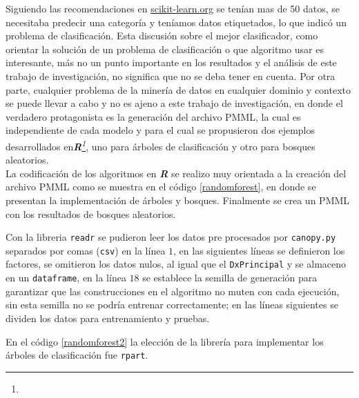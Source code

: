  Siguiendo las recomendaciones en \href{http://scikit-learn.org/stable/tutorial/machine_learning_map/index.html}{scikit-learn.org} se tenían mas de 50 datos, se necesitaba predecir una categoría y teníamos datos etiquetados, lo que indicó un problema de clasificación. Esta discusión sobre el mejor clasificador, como orientar la solución de un problema de clasificación o que algoritmo usar\cite{Caruana2006, Izenman2006, Hastie2009} es interesante, más no un punto importante en los resultados y el análisis de este trabajo de investigación, no significa que no se deba tener en cuenta. Por otra parte, cualquier problema de la minería de datos en cualquier dominio y contexto se puede llevar a cabo y no es ajeno a este trabajo de investigación, en donde el verdadero protagonista es la generación del archivo PMML, la cual es independiente de cada modelo y para el cual se propusieron dos ejemplos desarrollados en\textit{\textbf{R}\footnote{  }}, uno para árboles de clasificación y otro para bosques aleatorios.\\
 La codificación de los algoritmos en \textit{\textbf{R}} se realizo muy orientada a la creación del archivo PMML como se muestra en el código \ref{randomforest}, en donde se presentan la implementación de árboles y bosques. Finalmente se crea un PMML con los resultados de bosques aleatorios.
 
 
 
 Con la libreria \texttt{readr} se pudieron leer los datos pre procesados por \texttt{canopy.py} separados por comas (\texttt{csv}) en la línea $1$,  en las siguientes líneas se definieron los factores, se omitieron los datos nulos, al igual que el \texttt{DxPrincipal} y se almaceno en un \texttt{dataframe}, en la línea $18$ se establece la semilla de generación para garantizar que las construcciones en el algoritmo no muten con cada ejecución, sin esta semilla no se podría entrenar correctamente; en las líneas siguientes se dividen los datos para entrenamiento y pruebas.  
 
 En el código \ref{randomforest2} la elección de la librería para implementar los árboles de clasificación fue \texttt{rpart}.
 
